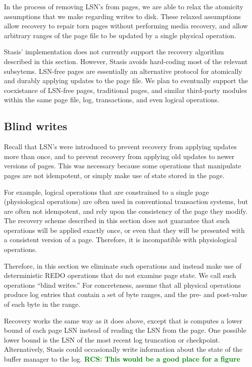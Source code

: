 \documentclass[letterpaper,twocolumn,10pt]{article}
\newcommand{\yad}{Stasis\xspace}
\newcommand{\yads}{Stasis'\xspace}
\newcommand{\rcs}[1]{\textcolor{green}{\bf RCS: #1}}
\begin{document}
In the process of removing LSN's from pages, we
are able to relax the atomicity assumptions that we make regarding
writes to disk.  These relaxed assumptions allow recovery to repair
torn pages without performing media recovery, and allow arbitrary
ranges of the page file to be updated by a single physical operation.

\yads implementation does not currently support the recovery algorithm
described in this section.  However, \yad avoids hard-coding most of
the relevant subsytems.  LSN-free pages are essentially an alternative
protocol for atomically and durably applying updates to the page file.
We plan to eventually support the coexistance of LSN-free pages,
traditional pages, and similar third-party modules within the same
page file, log, transactions, and even logical operations.

\subsection{Blind writes}
Recall that LSN's were introduced to prevent recovery from applying
updates more than once, and to prevent recovery from applying old
updates to newer versions of pages.  This was necessary because some
operations that manipulate pages are not idempotent, or simply make
use of state stored in the page.  

For example, logical operations that are constrained to a single page
(physiological operations) are often used in conventional transaction
systems, but are often not idempotent, and rely upon the consistency
of the page they modify.  The recovery scheme described in this
section does not guarantee that such operations will be applied
exactly once, or even that they will be presented with a consistent
version of a page.  Therefore, it is incompatible with physiological
operations.

Therefore, in this section we eliminate such operations and instead
make use of deterministic REDO operations that do not examine page
state.  We call such operations ``blind writes.''  For concreteness,
assume that all physical operations produce log entries that contain a
set of byte ranges, and the pre- and post-value of each byte in the
range.

Recovery works the same way as it does above, except that is computes
a lower bound of each page LSN instead of reading the LSN from the
page.  One possible lower bound is the LSN of the most recent log
truncation or checkpoint.  Alternatively, \yad could occasionally
write information about the state of the buffer manager to the log. \rcs{This would be a good place for a figure}
\end{document}
